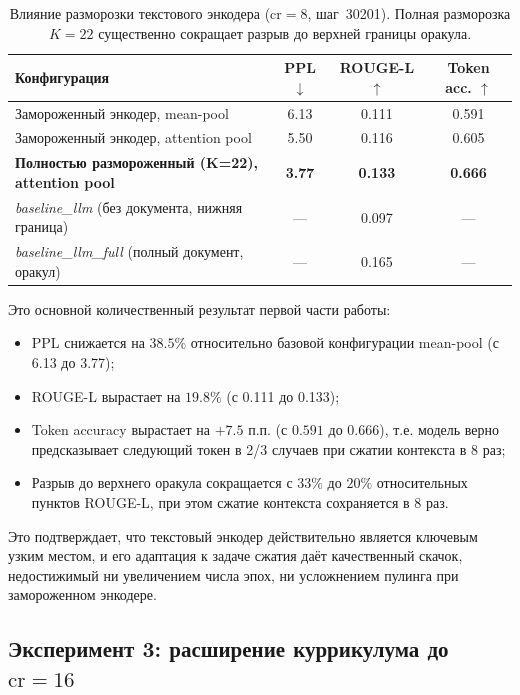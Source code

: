 \documentclass[a4paper,12pt]{extarticle}
\begin{document}
\begin{table}[ht]
\centering
\caption{Влияние разморозки текстового энкодера ($\text{cr}=8$, шаг~30201). Полная разморозка $K=22$ существенно сокращает разрыв до верхней границы оракула.}
\label{tab:exp-unfreeze}
\begin{tabular}{lccc}
\toprule
\textbf{Конфигурация} & \textbf{PPL} $\downarrow$ & \textbf{ROUGE-L} $\uparrow$ & \textbf{Token acc.} $\uparrow$ \\
\midrule
Замороженный энкодер, mean-pool           & 6.13 & 0.111 & 0.591 \\
Замороженный энкодер, attention pool      & 5.50 & 0.116 & 0.605 \\
\textbf{Полностью размороженный (K=22), attention pool} & \textbf{3.77} & \textbf{0.133} & \textbf{0.666} \\
\midrule
\textit{baseline\_llm} (без документа, нижняя граница) & --- & 0.097 & --- \\
\textit{baseline\_llm\_full} (полный документ, оракул) & --- & 0.165 & --- \\
\bottomrule
\end{tabular}
\end{table}

Это основной количественный результат первой части работы:
\begin{itemize}
    \item PPL снижается на $38.5\%$ относительно базовой конфигурации mean-pool (с 6.13 до 3.77);
    \item ROUGE-L вырастает на $19.8\%$ (с 0.111 до 0.133);
    \item Token accuracy вырастает на $+7.5$ п.п. (с $0.591$ до $0.666$), т.е. модель верно предсказывает следующий токен в 2/3 случаев при сжатии контекста в 8 раз;
    \item Разрыв до верхнего оракула сокращается с $33\%$ до $20\%$ относительных пунктов ROUGE-L, при этом сжатие контекста сохраняется в 8 раз.
\end{itemize}

Это подтверждает, что текстовый энкодер действительно является ключевым узким местом, и его адаптация к задаче сжатия даёт качественный скачок, недостижимый ни увеличением числа эпох, ни усложнением пулинга при замороженном энкодере.

\subsection{Эксперимент 3: расширение куррикулума до $\text{cr}=16$}\label{sec:exp-cr16}
\end{document}
